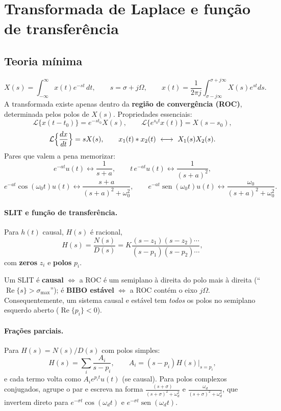 \section{Transformada de Laplace e função de transferência}\label{sec:laplace}

\subsection*{Teoria mínima}

\[
  X(s)=\int_{-\infty}^{\infty}x(t)e^{-st}\,dt,\qquad s=\sigma+j\Omega ,
  \qquad x(t)=\frac{1}{2\pi j}\int_{\sigma-j\infty}^{\sigma+j\infty}X(s)e^{st}ds .
\]
A transformada existe apenas dentro da \textbf{região de convergência (ROC)},
determinada pelos polos de $X(s)$. Propriedades essenciais:
\[
  \mathcal{L}\{x(t-t_0)\}=e^{-st_0}X(s),\qquad
  \mathcal{L}\{e^{s_0t}x(t)\}=X(s-s_0),
\]
\[
  \mathcal{L}\Bigl\{\frac{dx}{dt}\Bigr\}=sX(s),\qquad
  x_1(t)*x_2(t)\ \longleftrightarrow\ X_1(s)X_2(s).
\]
Pares que valem a pena memorizar:
\[
  e^{-at}u(t)\leftrightarrow\frac{1}{s+a},\qquad
  t\,e^{-at}u(t)\leftrightarrow\frac{1}{(s+a)^2},
\]
\[
  e^{-at}\cos(\omega_0 t)u(t)\leftrightarrow\frac{s+a}{(s+a)^2+\omega_0^2},
  \qquad
  e^{-at}\operatorname{sen}(\omega_0 t)u(t)\leftrightarrow\frac{\omega_0}{(s+a)^2+\omega_0^2}.
\]

\paragraph{SLIT e função de transferência.} Para $h(t)$ causal, $H(s)$ é
racional,
\[
  H(s)=\frac{N(s)}{D(s)}=K\frac{(s-z_1)(s-z_2)\cdots}{(s-p_1)(s-p_2)\cdots},
\]
com \textbf{zeros} $z_i$ e \textbf{polos} $p_i$.

\begin{teo}
Um SLIT é \textbf{causal} $\iff$ a ROC é um semiplano à direita do polo mais
à direita (``$\operatorname{Re}\{s\}>\sigma_{\max}$''); é \textbf{BIBO
estável} $\iff$ a ROC contém o eixo $j\Omega$. Consequentemente, um sistema
causal e estável tem \emph{todos} os polos no semiplano esquerdo aberto
($\operatorname{Re}\{p_i\}<0$).
\end{teo}

\paragraph{Frações parciais.} Para $H(s)=N(s)/D(s)$ com polos simples:
\[
  H(s)=\sum_i\frac{A_i}{s-p_i},\qquad A_i=(s-p_i)H(s)\big|_{s=p_i},
\]
e cada termo volta como $A_ie^{p_it}u(t)$ (se causal). Para polos complexos
conjugados, agrupe o par e escreva na forma
$\frac{(s+\sigma)}{(s+\sigma)^2+\omega_d^2}$ e
$\frac{\omega_d}{(s+\sigma)^2+\omega_d^2}$, que invertem direto para
$e^{-\sigma t}\cos(\omega_d t)$ e $e^{-\sigma t}\operatorname{sen}(\omega_d t)$.

